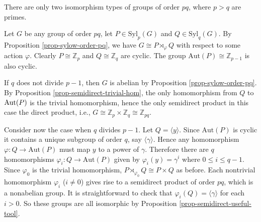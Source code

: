 \begin{example}
	There are only two isomorphism types of groups of order $pq$, where $p>q$ are primes.
	
	Let $G$ be any group of order $pq$, let $P \in \text{Syl}_p(G)$ and $Q \in \text{Syl}_q(G)$. By Proposition \ref{prop-sylow-order-pq}, we have $G \cong P \rtimes_\varphi Q$ with respect to some action $\varphi$.
	Clearly  $P \cong \mathbb{Z}_p$ and $Q \cong \mathbb{Z}_q$ are cyclic. The group $\text{Aut}(P)\cong \mathbb{Z}_{p-1}$ is also cyclic. 
	
	If $q$ does not divide $p-1$, then $G$ is abelian by Proposition \ref{prop-sylow-order-pq}. By Proposition \ref{prop-semidirect-trivial-hom},  the only homomorphism from $Q$ to $\operatorname{Aut} (P)$ is the trivial homomorphism, hence the only semidirect product in this case the direct product, i.e., $G \cong \mathbb{Z}_p\times \mathbb{Z}_q \cong \mathbb{Z}_{pq}$.
	
	Consider now the case when $q$ divides  $p-1$. Let $Q = \langle y \rangle$. Since $\text{Aut}(P)$ is cyclic it contains a unique subgroup of order $q$, say $\langle \gamma \rangle$. Hence any homomorphism $\varphi : Q \to \text{Aut}(P)$ must map $y$ to a power of $\gamma$. Therefore there are $q$ homomorphisms $\varphi_i : Q \to \text{Aut}(P)$ given by $\varphi_i(y) = \gamma^i$ where $0 \leq i \leq q-1$. Since $\varphi_0$ is the trivial homomorphism, $P \rtimes_{\varphi_0} Q \cong P \times Q$ as before. Each nontrivial homomorphism $\varphi_i$ ($i\neq 0$)  gives rise to a semidirect product  of order $pq$, which is a nonabelian group. It is straightforward to check that $\varphi_i(Q) = \langle \gamma \rangle$ for each  $i > 0$. So these groups are all isomorphic by Proposition \ref{prop-semidirect-useful-tool}.
\end{example}

